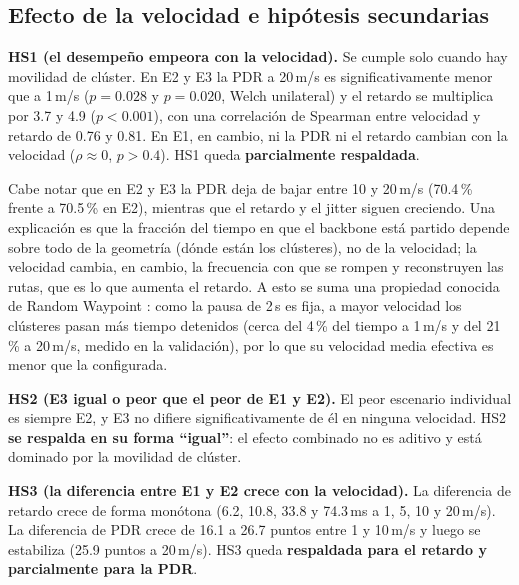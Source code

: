 \subsection{Efecto de la velocidad e hipótesis secundarias}

\textbf{HS1 (el desempeño empeora con la velocidad).} Se cumple solo cuando hay
movilidad de clúster. En E2 y E3 la PDR a 20\,m/s es significativamente menor que a
1\,m/s ($p = 0.028$ y $p = 0.020$, Welch unilateral) y el retardo se multiplica por
3.7 y 4.9 ($p < 0.001$), con una correlación de Spearman entre velocidad y retardo de
0.76 y 0.81. En E1, en cambio, ni la PDR ni el retardo cambian con la velocidad
($\rho \approx 0$, $p > 0.4$). HS1 queda \textbf{parcialmente respaldada}.

Cabe notar que en E2 y E3 la PDR deja de bajar entre 10 y 20\,m/s (70.4\,\% frente a
70.5\,\% en E2), mientras que el retardo y el jitter siguen creciendo. Una explicación es
que la fracción del tiempo en que el backbone está partido depende sobre todo de la
geometría (dónde están los clústeres), no de la velocidad; la velocidad cambia, en
cambio, la frecuencia con que se rompen y reconstruyen las rutas, que es lo que aumenta
el retardo. A esto se suma una propiedad conocida de Random Waypoint
\cite{yoon2003harmful}: como la pausa de 2\,s es fija, a mayor velocidad los clústeres
pasan más tiempo detenidos (cerca del 4\,\% del tiempo a 1\,m/s y del 21\,\% a 20\,m/s,
medido en la validación), por lo que su velocidad media efectiva es menor que la
configurada.

\textbf{HS2 (E3 igual o peor que el peor de E1 y E2).} El peor escenario individual es
siempre E2, y E3 no difiere significativamente de él en ninguna velocidad. HS2
\textbf{se respalda en su forma ``igual''}: el efecto combinado no es aditivo y está
dominado por la movilidad de clúster.

\textbf{HS3 (la diferencia entre E1 y E2 crece con la velocidad).} La diferencia de
retardo crece de forma monótona (6.2, 10.8, 33.8 y 74.3\,ms a 1, 5, 10 y 20\,m/s). La
diferencia de PDR crece de 16.1 a 26.7 puntos entre 1 y 10\,m/s y luego se estabiliza
(25.9 puntos a 20\,m/s). HS3 queda \textbf{respaldada para el retardo y parcialmente
para la PDR}.

